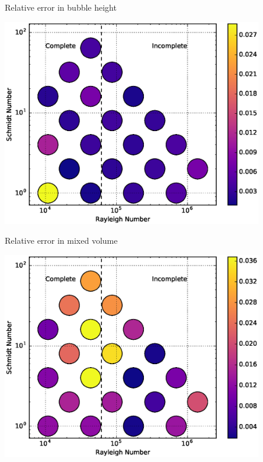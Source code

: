 \documentclass[12pt]{beamer}
\begin{document}
\begin{frame}[t]{Relative error in bubble height}
\begin{center}
\vspace{-11pt}
\includegraphics[width=0.85\textwidth]{graphics/DynamicsError-vs-Rayleigh-Schmidt.eps}
\end{center}
\end{frame}

\begin{frame}[t]{Relative error in mixed volume}
\begin{center}
\vspace{-11pt}
\includegraphics[width=0.85\textwidth]{graphics/MixingError-vs-Rayleigh-Schmidt.eps}
\end{center}
\end{frame}
\end{document}
